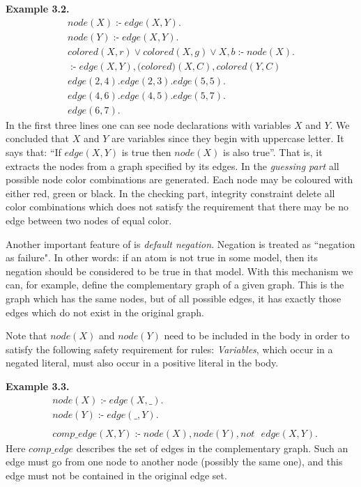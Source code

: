 \documentclass[14pt,a4paper, titlepage]{article}
\DeclareMathOperator{\leftimpl}{:-}
\begin{document}
\textbf{Example 3.2.}
\begin{align*}
&\mathit{node}(X) \leftimpl \mathit{edge}(X, Y). &\\
&\mathit{node}(Y) \leftimpl \mathit{edge}(X, Y). & \\
&\mathit{colored}(X, r) \vee \mathit{colored}(X, g) \vee \mathit{X, b} \leftimpl \mathit{node}(X). & \\
&\leftimpl \mathit{edge}(X, Y), \mathit(colored)(X, C), \mathit{colored}(Y, C) & \\
&\mathit{edge}(2, 4). \mathit{edge}(2, 3). \mathit{edge}(5, 5). & \\
&\mathit{edge}(4, 6). \mathit{edge}(4, 5). \mathit{edge}(5, 7). & \\
&\mathit{edge}(6, 7). &
\end{align*} 
In the first three lines one can see node declarations with variables $X$ and $Y$. We concluded that $X$ and $Y$ are variables since they begin with uppercase letter. It says that: \enquote{If $\mathit{edge}(X,Y)$ is true then $\mathit{node(X)}$ is also true}. That is, it extracts the nodes from a graph specified by its edges. In the \emph{guessing part} all possible node color combinations are generated. Each node may be coloured with either red, green or black. In the checking part, integrity constraint delete all color combinations which does not satisfy the requirement that there may be no edge between two nodes of equal color. 

Another important feature of \dlvhex{} is \emph{default negation}. Negation is treated as ``negation as failure". In other words: if an atom is not true in some model, then its negation should be considered to be true in that model. With this mechanism we can, for example, define the complementary graph of a given graph. This is the graph which has the same nodes, but of all possible edges, it has exactly those edges which do not exist in the original graph.

Note that $\mathit{node}(X)$ and $\mathit{node}(Y)$ need to be included in the body in order to satisfy the following safety requirement for rules: \emph{Variables}, which occur in a negated literal, must also occur in a positive literal in the body.

\textbf{Example 3.3.}
\begin{align*}
& \mathit{node}(X) \leftimpl \mathit{edge}(X, \_).\\
& \mathit{node}(Y) \leftimpl \mathit{edge}(\_, Y). \\
& \\
& \mathit{comp\_edge}(X, Y) \leftimpl \mathit{node}(X), \mathit{node}(Y), \mathit{not} \text{ } \mathit{edge}(X, Y). 
\end{align*}
Here $\mathit{comp\_edge}$ describes the set of edges in the complementary graph. Such an edge must go from one node to another node (possibly the same one), and this edge must not be contained in the original edge set. 
\end{document}
